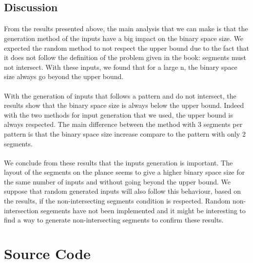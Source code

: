 \documentclass[letterpaper]{article}
\begin{document}
\subsection{Discussion}

\paragraph{}


From the results presented above, the main analysis that we can make is that
the generation method of the inputs have a big impact on the binary space size.
We expected the random method to not respect the upper bound due to the fact
that it does not follow the definition of the problem given in the book:
segments must not intersect. With these inputs, we found that for a large n,
the binary space size always go beyond the upper bound.

\paragraph{}

With the generation of inputs that follows
a pattern and do not intersect,
the results show that the binary space size is always below the upper bound.
Indeed with the two methods for input generation that we used, the upper bound is
always respected. The main difference between the method with 3 segments
per pattern is that
the binary space size increase compare to the pattern with only 2 segments.

\paragraph{}

We conclude from these results that the inputs generation is important.
The layout of the segments on the plance seems to give a higher binary space size
for the same number of inputs and without
going beyond the upper bound. We suppose that random generated inputs will also
follow this behaviour, based on the results, if the non-intersecting segments
condition is respected. Random non-intersection segements have not been implemented and
it might be interesting to find a way to generate non-intersecting segments to confirm
these results.

\newpage

\section{Source Code}
\end{document}
